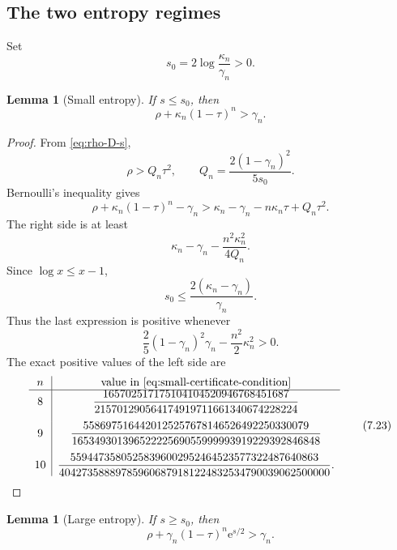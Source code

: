 \documentclass[11pt]{article}
\newtheorem{lemma}[theorem]{Lemma}
\theoremstyle{definition}
\newcommand{\1}{\mathbf{1}}
\newcommand{\e}{\mathrm{e}}
\begin{document}
\subsection{The two entropy regimes}

Set
\[
 s_0=2\log\frac{\kappa_n}{\gamma_n}>0.
\]

\begin{lemma}[Small entropy]\label{lem:small-entropy}
If $s\le s_0$, then
\[
 \rho+\kappa_n(1-\tau)^n>\gamma_n.
 \tag{7.21}\label{eq:small-contradiction}
\]
\end{lemma}

\begin{proof}
From \eqref{eq:rho-D-s},
\[
 \rho>Q_n\tau^2,
 \qquad
 Q_n=\frac{2(1-\gamma_n)^2}{5s_0}.
\]
Bernoulli's inequality gives
\[
 \rho+\kappa_n(1-\tau)^n-\gamma_n
 >\kappa_n-\gamma_n-n\kappa_n\tau+Q_n\tau^2.
\]
The right side is at least
\[
 \kappa_n-\gamma_n-\frac{n^2\kappa_n^2}{4Q_n}.
\]
Since $\log x\le x-1$,
\[
 s_0\le\frac{2(\kappa_n-\gamma_n)}{\gamma_n}.
\]
Thus the last expression is positive whenever
\[
 \frac25(1-\gamma_n)^2\gamma_n
 -\frac{n^2}{2}\kappa_n^2>0.
 \tag{7.22}\label{eq:small-certificate-condition}
\]
The exact positive values of the left side are
\[
\begin{array}{c|c}
 n&\text{value in \eqref{eq:small-certificate-condition}}\\ \hline
 8&
 \dfrac{165702517175104104520946768451687}
 {215701290564174919711661340674228224}\\[4mm]
 9&
 \dfrac{5586975164420125257678146526492250330079}
 {16534930139652222569055999993919229392846848}\\[4mm]
 10&
 \dfrac{55944735805258396002952464523577322487640863}
 {404273588897859606879181224832534790039062500000}.
\end{array}
\tag{7.23}\label{eq:small-certificates}
\]
\end{proof}

\begin{lemma}[Large entropy]\label{lem:large-entropy}
If $s\ge s_0$, then
\[
 \rho+\gamma_n(1-\tau)^n\e^{s/2}>\gamma_n.
 \tag{7.24}\label{eq:large-contradiction}
\]
\end{lemma}
\end{document}
